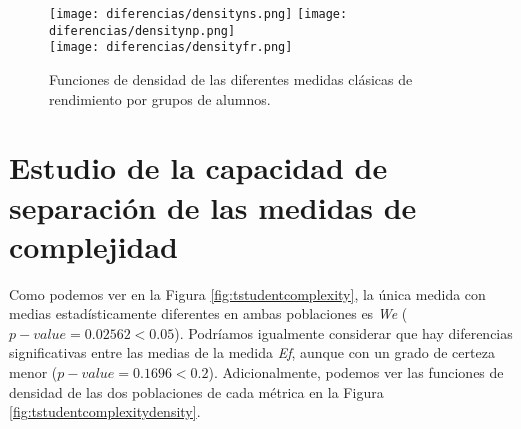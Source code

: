 \begin{figure}[H]
\centering
\texttt{[image: diferencias/densityns.png]}
\texttt{[image: diferencias/densitynp.png]} \\
\texttt{[image: diferencias/densityfr.png]}
\caption{Funciones de densidad de las diferentes medidas clásicas de rendimiento por grupos de alumnos.}
\label{fig:tstudentcomplexitydensityclassic}
\end{figure}

\section{Estudio de la capacidad de separación de las medidas de complejidad}

Como podemos ver en la Figura \ref{fig:tstudentcomplexity}, la única medida con medias estadísticamente diferentes en ambas poblaciones es \emph{We} ($p-value = 0.02562 < 0.05$). Podríamos igualmente considerar que hay diferencias significativas entre las medias de la medida \emph{Ef}, aunque con un grado de certeza menor ($p-value = 0.1696 < 0.2$). Adicionalmente, podemos ver las funciones de densidad de las dos poblaciones de cada métrica en la Figura \ref{fig:tstudentcomplexitydensity}.

